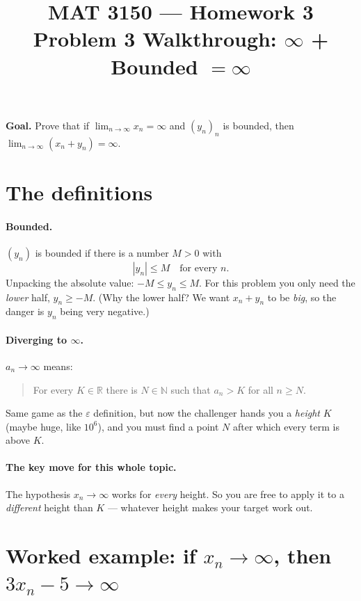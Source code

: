 \documentclass[11pt]{article}
\title{MAT 3150 --- Homework 3\\
\large Problem 3 Walkthrough: $\infty$ + Bounded $= \infty$}
\author{}
\date{}
\begin{document}
\maketitle

\textbf{Goal.} Prove that if $\displaystyle\lim_{n\to\infty}x_n=\infty$
and $(y_n)_n$ is bounded, then
$\displaystyle\lim_{n\to\infty}(x_n+y_n)=\infty$.

\section*{The definitions}

\paragraph{Bounded.} $(y_n)$ is bounded if there is a number $M>0$ with
\[
  |y_n| \le M \quad\text{for every } n .
\]
Unpacking the absolute value: $-M \le y_n \le M$. For this problem you
only need the \emph{lower} half, $y_n \ge -M$. (Why the lower half? We
want $x_n+y_n$ to be \emph{big}, so the danger is $y_n$ being very
negative.)

\paragraph{Diverging to $\infty$.} $a_n\to\infty$ means:
\begin{quote}
For every $K\in\mathbb{R}$ there is $N\in\mathbb{N}$ such that
$a_n > K$ for all $n\ge N$.
\end{quote}
Same game as the $\varepsilon$ definition, but now the challenger hands
you a \emph{height} $K$ (maybe huge, like $10^{6}$), and you must find a
point $N$ after which every term is above $K$.

\paragraph{The key move for this whole topic.} The hypothesis
$x_n\to\infty$ works for \emph{every} height. So you are free to apply it
to a \emph{different} height than $K$ --- whatever height makes your
target work out.

\section*{Worked example: if $x_n\to\infty$, then $3x_n-5\to\infty$}
\end{document}
